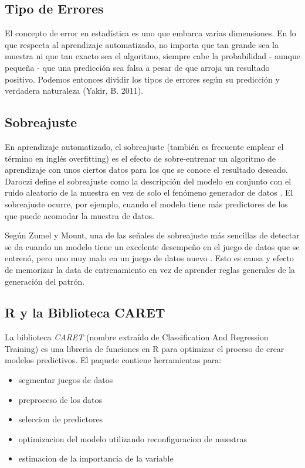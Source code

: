 \documentclass[letterpaper, spanish, 11pt]{report}
\begin{document}
\subsection{Tipo de Errores}
El concepto de error en estadística es uno que embarca varias dimensiones. En lo que respecta al aprendizaje automatizado, no importa que tan grande sea la muestra ni que tan exacto sea el algoritmo, siempre cabe la probabilidad - aunque pequeña - que una predicción sea falsa a pesar de que arroja un resultado positivo. Podemos entonces dividir los tipos de errores según su predicción y verdadera naturaleza (Yakir, B. 2011). 

\subsection{Sobreajuste}
En aprendizaje automatizado, el sobreajuste (también es frecuente emplear el término en inglés overfitting) es el efecto de sobre-entrenar un algoritmo de aprendizaje con unos ciertos datos para los que se conoce el resultado deseado. Daroczi define el sobreajuste como la descripción del modelo en conjunto con el ruido aleatorio de la muestra en vez de solo el fenómeno generador de datos \cite{daroczi}. El sobreajuste ocurre, por ejemplo, cuando el modelo tiene más predictores de los que puede acomodar la muestra de datos.

Según Zumel y Mount, una de las señales de sobreajuste más sencillas de detectar se da cuando un modelo tiene un excelente desempeño en el juego de datos que se entrenó, pero uno muy malo en un juego de datos nuevo \cite{zumelMount}. Esto es causa y efecto de memorizar la data de entrenamiento en vez de aprender reglas generales de la generación del patrón. 

\subsection{R y la Biblioteca CARET}
La biblioteca \emph{CARET} (nombre extraído de Classification And Regression Training) es una libreria de funciones en R para optimizar el proceso de crear modelos predictivos. El paquete contiene herramientas para:

\begin{itemize}
	\item segmentar juegos de datos
	\item preproceso de los datos
	\item seleccion de predictores
	\item optimizacion del modelo utilizando reconfiguracion de muestras
	\item estimacion de la importancia de la variable
\end{itemize}
\end{document}
